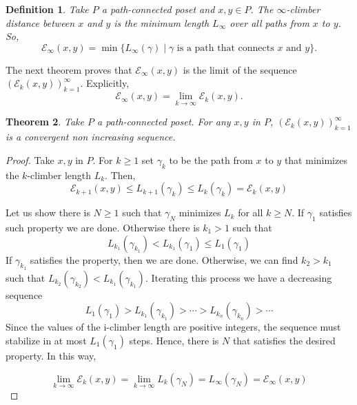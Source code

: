 \documentclass{article}[12pt]
\theoremstyle{exampstyle}
\newtheorem{theorem}{Theorem}[section]
\newtheorem{definition}[theorem]{Definition}
\theoremstyle{remark}
\newcommand{\E}{\mathcal{E}}
\begin{document}
\begin{definition}
    Take $P$ a path-connected poset and $x,y \in P$. The $\infty$-climber distance between $x$ and $y$ is the minimum length $L_\infty$ over all paths from $x$ to $y$. So,
    \[\E_\infty(x,y) = \min \{ L_{\infty}(\gamma) \mid \gamma \text { is a path that connects } x \text{ and } y\}. \]
    
\end{definition}

The next theorem proves that $\E_\infty(x,y)$ is the limit of the sequence $\left( \E_k(x,y) \right)_{k=1}^\infty$. Explicitly,
    \begin{equation*}
        \E_\infty(x,y) = \lim_{k \to \infty } \E_k(x,y).
    \end{equation*}

\begin{theorem}
    Take $P$ a path-connected poset. For any $x,y$ in $P$, $\left( \E_k(x,y) \right)_{k=1}^\infty$ is a convergent non increasing sequence. 
    \label{thm:E_convergent}
\end{theorem}
\begin{proof}
        Take $x,y$ in $P$. For $k \geq 1$  set $\gamma_k$ to be the path from $x$ to $y$ that minimizes the $k$-climber length $L_k$. Then, 
        \begin{equation*}
            \E_{k+1}(x,y) \leq L_{k+1}(\gamma_k) \leq L_{k}(\gamma_k) =  \E_k(x,y)
        \end{equation*}

    Let us show there is $N \geq 1$ such that $\gamma_N$ minimizes $L_k$ for all $k \geq N$.
    If $\gamma_1$ satisfies such property we are done. Otherwise there is $k_1 > 1$ such that
    \[
    L_{k_1}(\gamma_{k_1}) < L_{k_1}(\gamma_1) \leq L_1(\gamma_1)
    \]
    If $\gamma_{k_1}$ satisfies the property, then we are done. Otherwise, we can find $k_2 > k_1$ such that $ L_{k_2}(\gamma_{k_2}) <  L_{k_1}(\gamma_{k_1})$. Iterating this process we have a decreasing sequence
    \[
    L_1(\gamma_1) > L_{k_1}(\gamma_{k_1}) > \cdots > L_{k_n}(\gamma_{k_n}) > \cdots
    \]
    Since the values of the i-climber length are positive integers, the sequence must stabilize in at most $L_1(\gamma_1)$ steps. Hence, there is $N$ that satisfies the desired property. In this way,

    \[
     \lim\limits_{k \rightarrow\infty} \E_k(x,y) = \lim\limits_{k \rightarrow\infty} L_k(\gamma_N) = L_\infty(\gamma_N) = \E_\infty(x,y)
    \]
    \end{proof}
\end{document}
